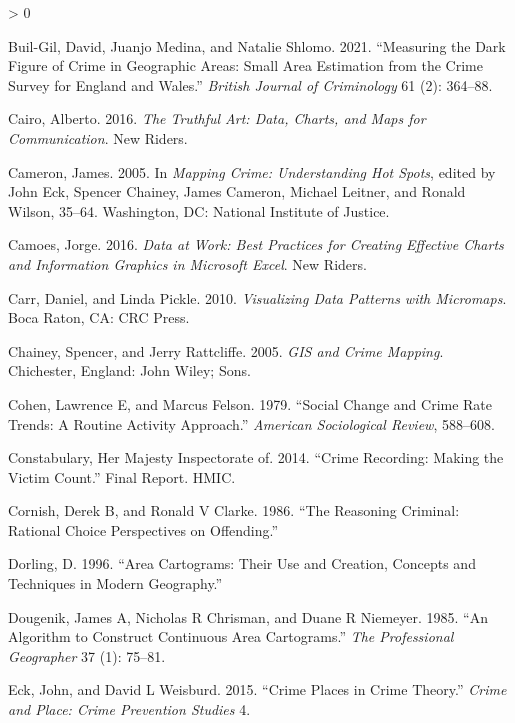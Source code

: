 \documentclass[
]{book}
\newlength{\cslhangindent}
\newenvironment{CSLReferences}[2] %
 {%
  \setlength{\parindent}{0pt}
  \ifodd #1 \everypar{\setlength{\hangindent}{\cslhangindent}}\ignorespaces\fi
  \ifnum #2 > 0
  \setlength{\parskip}{#2\baselineskip}
  \fi
 }%
 {}
\begin{document}
\begin{CSLReferences}{1}{0}
\leavevmode\hypertarget{ref-Buil-Gil_2021}{}%
Buil-Gil, David, Juanjo Medina, and Natalie Shlomo. 2021. {``Measuring the Dark Figure of Crime in Geographic Areas: Small Area Estimation from the Crime Survey for England and Wales.''} \emph{British Journal of Criminology} 61 (2): 364--88.

\leavevmode\hypertarget{ref-Cairo_2016}{}%
Cairo, Alberto. 2016. \emph{The Truthful Art: Data, Charts, and Maps for Communication}. New Riders.

\leavevmode\hypertarget{ref-Cameron_2005}{}%
Cameron, James. 2005. In \emph{Mapping Crime: Understanding Hot Spots}, edited by John Eck, Spencer Chainey, James Cameron, Michael Leitner, and Ronald Wilson, 35--64. Washington, DC: National Institute of Justice.

\leavevmode\hypertarget{ref-Camoes_2016}{}%
Camoes, Jorge. 2016. \emph{Data at Work: Best Practices for Creating Effective Charts and Information Graphics in Microsoft Excel}. New Riders.

\leavevmode\hypertarget{ref-Carr_2010}{}%
Carr, Daniel, and Linda Pickle. 2010. \emph{Visualizing Data Patterns with Micromaps}. Boca Raton, CA: CRC Press.

\leavevmode\hypertarget{ref-Chainey_2005}{}%
Chainey, Spencer, and Jerry Rattcliffe. 2005. \emph{GIS and Crime Mapping}. Chichester, England: John Wiley; Sons.

\leavevmode\hypertarget{ref-Cohen_1979}{}%
Cohen, Lawrence E, and Marcus Felson. 1979. {``Social Change and Crime Rate Trends: A Routine Activity Approach.''} \emph{American Sociological Review}, 588--608.

\leavevmode\hypertarget{ref-HMIC_2014}{}%
Constabulary, Her Majesty Inspectorate of. 2014. {``Crime Recording: Making the Victim Count.''} Final Report. HMIC.

\leavevmode\hypertarget{ref-Cornish_1986}{}%
Cornish, Derek B, and Ronald V Clarke. 1986. {``The Reasoning Criminal: Rational Choice Perspectives on Offending.''}

\leavevmode\hypertarget{ref-Dorling_1996}{}%
Dorling, D. 1996. {``Area Cartograms: Their Use and Creation, Concepts and Techniques in Modern Geography.''}

\leavevmode\hypertarget{ref-Dougenik_1985}{}%
Dougenik, James A, Nicholas R Chrisman, and Duane R Niemeyer. 1985. {``An Algorithm to Construct Continuous Area Cartograms.''} \emph{The Professional Geographer} 37 (1): 75--81.

\leavevmode\hypertarget{ref-Eck_2015}{}%
Eck, John, and David L Weisburd. 2015. {``Crime Places in Crime Theory.''} \emph{Crime and Place: Crime Prevention Studies} 4.


\end{CSLReferences}
\end{document}
